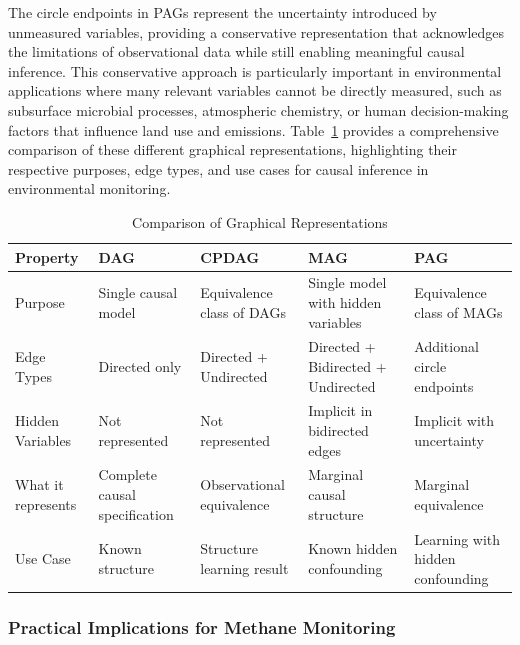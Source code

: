 The circle endpoints in PAGs represent the uncertainty introduced by unmeasured variables, providing a conservative representation that acknowledges the limitations of observational data while still enabling meaningful causal inference. This conservative approach is particularly important in environmental applications where many relevant variables cannot be directly measured, such as subsurface microbial processes, atmospheric chemistry, or human decision-making factors that influence land use and emissions. Table~\ref{tab:graph_types} provides a comprehensive comparison of these different graphical representations, highlighting their respective purposes, edge types, and use cases for causal inference in environmental monitoring.

\begin{table}[H]
	\centering
	\caption[Comparison of Graphical Representations]{Comparison of Graphical Representations}
	\label{tab:graph_types}
	\begin{tabular}{>{\raggedright\arraybackslash}p{2cm}|>{\raggedright\arraybackslash}p{3cm}|>{\raggedright\arraybackslash}p{3cm}|>{\raggedright\arraybackslash}p{3cm}|>{\raggedright\arraybackslash}p{3cm}}
		\hline
		\textbf{Property}  & \textbf{DAG}                  & \textbf{CPDAG}            & \textbf{MAG}                       & \textbf{PAG}                     \\
		\hline
		Purpose            & Single causal model           & Equivalence class of DAGs & Single model with hidden variables & Equivalence class of MAGs        \\
		Edge Types         & Directed only                 & Directed + Undirected     & Directed + Bidirected + Undirected & Additional circle endpoints      \\
		Hidden Variables   & Not represented               & Not represented           & Implicit in bidirected edges       & Implicit with uncertainty        \\
		What it represents & Complete causal specification & Observational equivalence & Marginal causal structure          & Marginal equivalence             \\
		Use Case           & Known structure               & Structure learning result & Known hidden confounding           & Learning with hidden confounding \\
		\hline
	\end{tabular}
\end{table}

\subsubsection{Practical Implications for Methane Monitoring}

